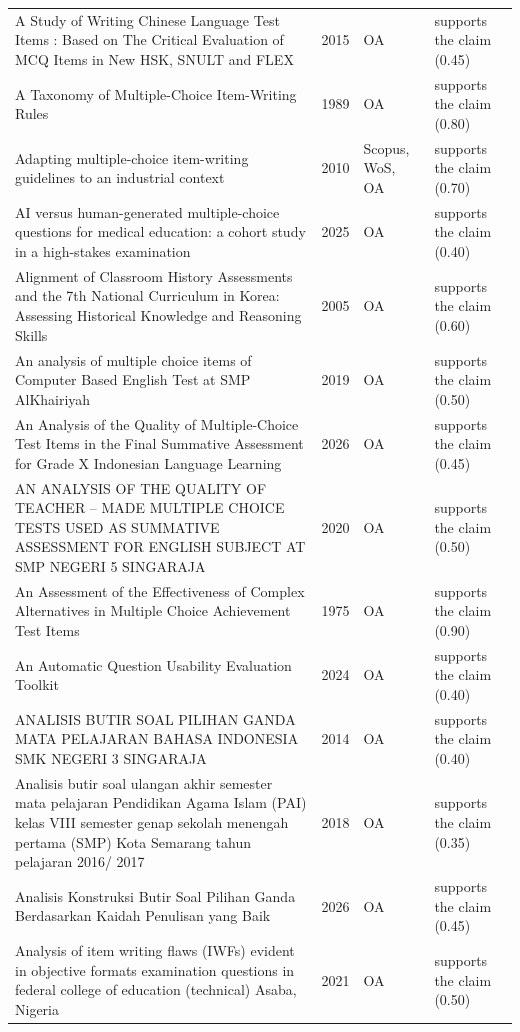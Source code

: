\begin{longtable}{@{}%
  >{\raggedright\arraybackslash}p{}c%
  >{\raggedright\arraybackslash}p{}%
  >{\raggedright\arraybackslash}p{}@{}}
A Study of Writing Chinese Language Test Items : Based on The Critical Evaluation of MCQ Items in New HSK, SNULT and FLEX & 2015 & OA & supports the claim (0.45) \\
A Taxonomy of Multiple-Choice Item-Writing Rules & 1989 & OA & supports the claim (0.80) \\
Adapting multiple-choice item-writing guidelines to an industrial context & 2010 & Scopus, WoS, OA & supports the claim (0.70) \\
AI versus human-generated multiple-choice questions for medical education: a cohort study in a high-stakes examination & 2025 & OA & supports the claim (0.40) \\
Alignment of Classroom History Assessments and the 7th National Curriculum in Korea: Assessing Historical Knowledge and Reasoning Skills & 2005 & OA & supports the claim (0.60) \\
An analysis of multiple choice items of Computer Based English Test at SMP AlKhairiyah & 2019 & OA & supports the claim (0.50) \\
An Analysis of the Quality of Multiple-Choice Test Items in the Final Summative Assessment for Grade X Indonesian Language Learning & 2026 & OA & supports the claim (0.45) \\
AN ANALYSIS OF THE QUALITY OF TEACHER -- MADE MULTIPLE CHOICE TESTS USED AS SUMMATIVE ASSESSMENT FOR ENGLISH SUBJECT AT SMP NEGERI 5 SINGARAJA & 2020 & OA & supports the claim (0.50) \\
An Assessment of the Effectiveness of Complex Alternatives in Multiple Choice Achievement Test Items & 1975 & OA & supports the claim (0.90) \\
An Automatic Question Usability Evaluation Toolkit & 2024 & OA & supports the claim (0.40) \\
ANALISIS BUTIR SOAL PILIHAN GANDA MATA PELAJARAN BAHASA INDONESIA SMK NEGERI 3 SINGARAJA & 2014 & OA & supports the claim (0.40) \\
Analisis butir soal ulangan akhir semester mata pelajaran Pendidikan Agama Islam (PAI) kelas VIII semester genap sekolah menengah pertama (SMP) Kota Semarang tahun pelajaran 2016/ 2017 & 2018 & OA & supports the claim (0.35) \\
Analisis Konstruksi Butir Soal Pilihan Ganda Berdasarkan Kaidah Penulisan yang Baik & 2026 & OA & supports the claim (0.45) \\
Analysis of item writing flaws (IWFs) evident in objective formats examination questions in federal college of education (technical) Asaba, Nigeria & 2021 & OA & supports the claim (0.50) \\

\end{longtable}
